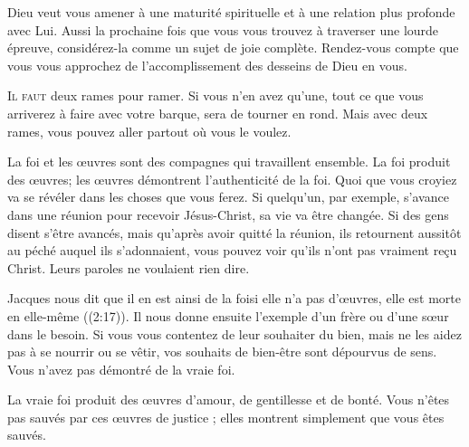 Dieu veut vous amener à une maturité spirituelle et à une relation
 plus profonde avec Lui. Aussi la prochaine fois que vous vous trouvez
 à traverser une lourde épreuve, considérez-la 
 comme un sujet de joie complète.
 Rendez-vous compte que vous vous approchez de l'accomplissement
 des desseins de Dieu en vous. 

\dvrule






\lettrine{I}{l faut} deux rames pour ramer.
 Si vous n'en avez qu'une, tout ce que vous arriverez à faire
 avec votre barque, sera de tourner en rond.
 Mais avec deux rames, vous pouvez aller partout où vous le voulez. 

La foi et les \oe{}uvres sont des compagnes qui travaillent ensemble.
 La foi produit des \oe{}uvres; les \oe{}uvres démontrent l'authenticité de la foi.
 Quoi que vous croyiez va se révéler dans les choses que vous ferez.
 Si quelqu'un, par exemple, s'avance dans une réunion pour recevoir
 Jésus-Christ, sa vie va être changée. Si des gens disent s'être avancés,
 mais qu'après avoir quitté la réunion, ils retournent aussitôt au péché
 auquel ils s'adonnaient, vous pouvez voir qu'ils n'ont pas vraiment
 re\c{c}u Christ. Leurs paroles ne voulaient rien dire. 


Jacques nous dit que \Og il en est ainsi de la foi\frcolon si elle n'a pas d'\oe{}uvres,
 elle est morte en elle-même \Fg{} ((2:17)).
 Il nous donne ensuite l'exemple d'un frère ou d'une s\oe{}ur dans le besoin.
 Si vous vous contentez de leur souhaiter du bien, mais ne les aidez pas
 à se nourrir ou se vêtir, vos souhaits de bien-être sont dépourvus de sens.
 Vous n'avez pas démontré de la vraie foi. 

La vraie foi produit des \oe{}uvres d'amour, de gentillesse et de bonté.
 Vous n'êtes pas sauvés par ces \oe{}uvres de justice ;
 elles montrent simplement que vous êtes sauvés. 

